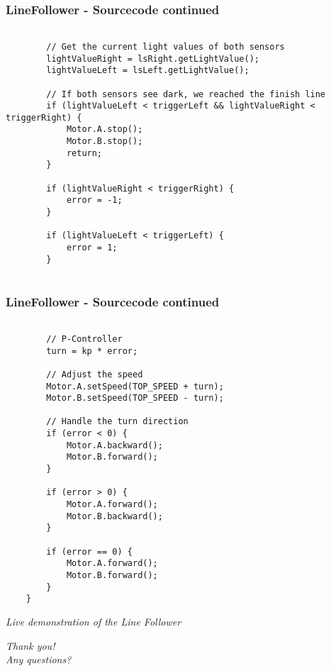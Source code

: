 \documentclass{beamer}
\begin{document}
\begin{frame}[fragile]
\frametitle{LineFollower - Sourcecode continued}
\begin{lstlisting}[firstnumber = 64]

		// Get the current light values of both sensors
		lightValueRight = lsRight.getLightValue();
		lightValueLeft = lsLeft.getLightValue();

		// If both sensors see dark, we reached the finish line
		if (lightValueLeft < triggerLeft && lightValueRight < triggerRight) {
			Motor.A.stop();
			Motor.B.stop();
			return;
		}
			
		if (lightValueRight < triggerRight) {
			error = -1;
		}

		if (lightValueLeft < triggerLeft) {
			error = 1;
		}
		
		\end{lstlisting}
\end{frame}

\begin{frame}[fragile]
\frametitle{LineFollower - Sourcecode continued}
\begin{lstlisting}[firstnumber = 83]

		// P-Controller
		turn = kp * error;

		// Adjust the speed
		Motor.A.setSpeed(TOP_SPEED + turn);
		Motor.B.setSpeed(TOP_SPEED - turn);

		// Handle the turn direction
		if (error < 0) {
			Motor.A.backward();
			Motor.B.forward();
		}

		if (error > 0) {
			Motor.A.forward();
			Motor.B.backward();
		}

		if (error == 0) {
			Motor.A.forward();
			Motor.B.forward();
		}
	}

\end{lstlisting}
\end{frame}

\begin{frame}{}
  \centering \Large
  \emph{\vspace{1em}Live demonstration of the Line Follower}
\end{frame}


\begin{frame}{}
  \centering \Large
  \emph{\vspace{1em}Thank you!\\Any questions?}
\end{frame}
 
\end{document}
